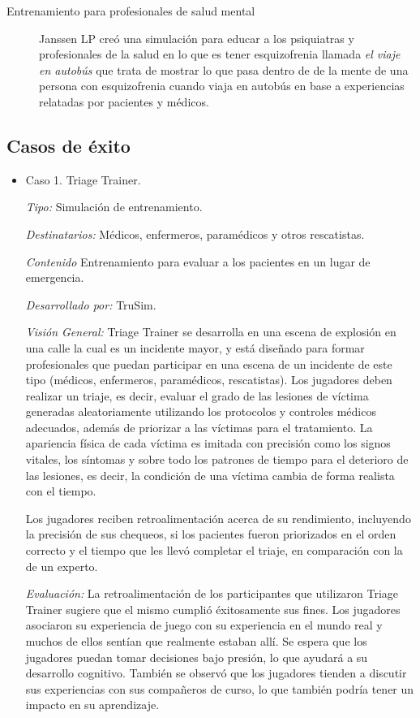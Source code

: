 \begin{description}
\item[Entrenamiento para profesionales de salud mental] Janssen LP creó una
	simulación para educar a los psiquiatras y profesionales de la salud en
	lo que es tener esquizofrenia llamada \emph{el viaje en autobús} que
	trata de mostrar lo que pasa dentro de de la mente de una persona con
	esquizofrenia cuando viaja en autobús en base a experiencias relatadas
	por pacientes y médicos\cite{mantovani:vr}. 

\end{description}

\subsection{Casos de éxito}


\begin{itemize}
\item Caso 1. Triage Trainer.

\emph{Tipo: } Simulación de entrenamiento.

\emph{Destinatarios: } Médicos, enfermeros, paramédicos y otros rescatistas.

\emph{Contenido} Entrenamiento para evaluar a los pacientes en un lugar de emergencia.

\emph{Desarrollado por: } TruSim.

\emph{Visión General: } Triage Trainer se desarrolla en una escena de explosión en una calle
la cual es un incidente mayor, y está diseñado para formar profesionales que puedan participar 
en una escena de un incidente de este tipo (médicos, enfermeros, paramédicos, rescatistas). 
Los jugadores deben realizar un triaje, es decir, evaluar el grado de las lesiones de víctima
generadas aleatoriamente utilizando los protocolos y controles médicos adecuados, además de
priorizar a las víctimas para el tratamiento. La apariencia física de cada víctima es imitada con
precisión como los signos vitales, los síntomas y sobre todo los patrones de tiempo para el deterioro
de las lesiones, es decir, la condición de una víctima cambia de forma realista con el tiempo.

Los jugadores reciben retroalimentación acerca de su rendimiento, incluyendo la precisión de sus
chequeos, si los pacientes fueron priorizados en el orden correcto y el tiempo que les llevó completar
el triaje, en comparación con la de un experto.

\emph{Evaluación: } La retroalimentación de los participantes que utilizaron Triage Trainer sugiere
que el mismo cumplió éxitosamente sus fines. Los jugadores asociaron su experiencia de juego con su
experiencia en el mundo real y muchos de ellos sentían que realmente estaban allí. Se espera que los
jugadores puedan tomar decisiones bajo presión, lo que ayudará a su desarrollo cognitivo. También se 
observó que los jugadores tienden a discutir sus experiencias con sus compañeros de curso, lo que
también podría tener un impacto en su aprendizaje.


\end{itemize}
